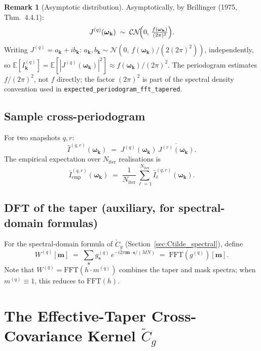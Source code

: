\documentclass[12pt]{article}
\theoremstyle{definition}
\newtheorem{remark}{Remark}
\begin{document}
\begin{remark}[Asymptotic distribution]
Asymptotically, by Brillinger (1975, Thm.~4.4.1):
\[
  J^{(q)}(\boldsymbol{\omega}_{\mathbf{k}}) \;\sim\; \mathcal{CN}\!\Bigl(0,\,\tfrac{f(\boldsymbol{\omega}_{\mathbf{k}})}{(2\pi)^2}\Bigr).
\]
Writing $J^{(q)} = a_{\mathbf{k}} + ib_{\mathbf{k}}$:
$a_{\mathbf{k}}, b_{\mathbf{k}} \sim \mathcal{N}(0,\, f(\boldsymbol{\omega}_{\mathbf{k}})/(2(2\pi)^2))$,
independently, so
$\mathbb{E}[I^{(q)}_{\mathbf{k}}] = \mathbb{E}[|J^{(q)}(\boldsymbol{\omega}_{\mathbf{k}})|^2]
\approx f(\boldsymbol{\omega}_{\mathbf{k}})/(2\pi)^2$.
The periodogram estimates $f/(2\pi)^2$, not $f$ directly;
the factor $(2\pi)^2$ is part of the spectral density convention used
in \texttt{expected\_periodogram\_fft\_tapered}.
\end{remark}

\subsection{Sample cross-periodogram}

For two snapshots $q, r$:
\[
  \hat{I}^{(q,r)}(\boldsymbol{\omega}_{\mathbf{k}})
  \;=\; J^{(q)}(\boldsymbol{\omega}_{\mathbf{k}})\,\overline{J^{(r)}(\boldsymbol{\omega}_{\mathbf{k}})}.
\]
The empirical expectation over $N_{\mathrm{iter}}$ realisations is
\[
  \bar{I}^{(q,r)}_{\mathrm{emp}}(\boldsymbol{\omega}_{\mathbf{k}})
  \;=\; \frac{1}{N_{\mathrm{iter}}}\sum_{\ell=1}^{N_{\mathrm{iter}}}
    \hat{I}^{(q,r)}_\ell(\boldsymbol{\omega}_{\mathbf{k}}).
\]

\subsection{DFT of the taper (auxiliary, for spectral-domain formulas)}

For the spectral-domain formula of $\tilde{C}_g$
(Section~\ref{sec:Ctilde_spectral}), define
\[
  W^{(q)}[\mathbf{m}]
  \;=\; \sum_{\mathbf{s}} g^{(q)}_{\mathbf{s}}\,e^{-i2\pi\mathbf{m}\cdot\mathbf{s}/(MN)}
  \;=\; \mathrm{FFT}(g^{(q)})[\mathbf{m}].
\]
Note that $W^{(q)} = \mathrm{FFT}(h \cdot m^{(q)})$ combines the
taper and mask spectra; when $m^{(q)}\equiv 1$, this reduces to
$\mathrm{FFT}(h)$.


\section{The Effective-Taper Cross-Covariance Kernel $\tilde{C}_g$}
\label{sec:Ctilde}
\end{document}

